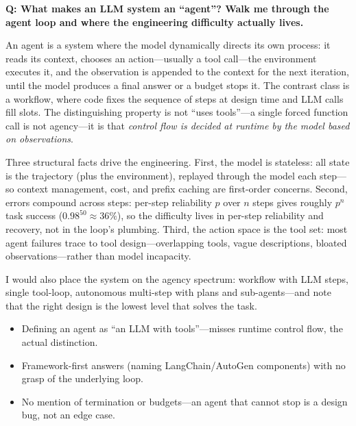 
\begin{interviewq}
\textbf{Q: What makes an LLM system an ``agent''? Walk me through the agent loop and where the engineering difficulty actually lives.}

 \quad {} \quad \badgefreq{\freqhigh}

\stronganswer

An agent is a system where the model dynamically directs its own process: it reads its context, chooses an action---usually a tool call---the environment executes it, and the observation is appended to the context for the next iteration, until the model produces a final answer or a budget stops it. The contrast class is a workflow, where code fixes the sequence of steps at design time and LLM calls fill slots. The distinguishing property is not ``uses tools''---a single forced function call is not agency---it is that \textit{control flow is decided at runtime by the model based on observations}.

Three structural facts drive the engineering. First, the model is stateless: all state is the trajectory (plus the environment), replayed through the model each step---so context management, cost, and prefix caching are first-order concerns. Second, errors compound across steps: per-step reliability $p$ over $n$ steps gives roughly $p^n$ task success ($0.98^{50} \approx 36\%$), so the difficulty lives in per-step reliability and recovery, not in the loop's plumbing. Third, the action space is the tool set: most agent failures trace to tool design---overlapping tools, vague descriptions, bloated observations---rather than model incapacity.

I would also place the system on the agency spectrum: workflow with LLM steps, single tool-loop, autonomous multi-step with plans and sub-agents---and note that the right design is the lowest level that solves the task.

\redflags
\begin{itemize}
    \item Defining an agent as ``an LLM with tools''---misses runtime control flow, the actual distinction.
    \item Framework-first answers (naming LangChain/AutoGen components) with no grasp of the underlying loop.
    \item No mention of termination or budgets---an agent that cannot stop is a design bug, not an edge case.
\end{itemize}


\end{interviewq}
